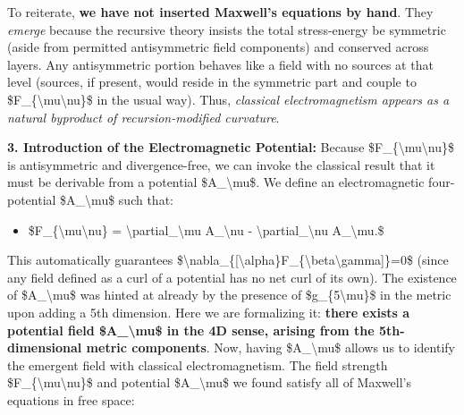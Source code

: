 \documentclass[
]{article}
\begin{document}
{To reiterate, \textbf{we have not inserted Maxwell's equations by hand}.
They \emph{emerge} because the recursive theory insists the total
stress-energy be symmetric (aside from permitted antisymmetric field
components) and conserved across layers. Any antisymmetric portion
behaves like a field with no sources at that level (sources, if present,
would reside in the symmetric part and couple to
\$F\_\{\textbackslash mu\textbackslash nu\}\$ in the usual way). Thus,
\emph{classical electromagnetism appears as a natural byproduct of
recursion-modified curvature}\hspace{0pt}.

\textbf{3. Introduction of the Electromagnetic Potential:} Because
\$F\_\{\textbackslash mu\textbackslash nu\}\$ is antisymmetric and
divergence-free, we can invoke the classical result that it must be
derivable from a potential \$A\_\textbackslash mu\$. We define an
electromagnetic four-potential \$A\_\textbackslash mu\$ such that:

\begin{itemize}
\item
  \$F\_\{\textbackslash mu\textbackslash nu\} =
  \textbackslash partial\_\textbackslash mu A\_\textbackslash nu -
  \textbackslash partial\_\textbackslash nu A\_\textbackslash mu.\$
\end{itemize}

This automatically guarantees
\$\textbackslash nabla\_\{{[}\textbackslash alpha\}F\_\{\textbackslash beta\textbackslash gamma{]}\}=0\$
(since any field defined as a curl of a potential has no net curl of its
own). The existence of \$A\_\textbackslash mu\$ was hinted at already by
the presence of \$g\_\{5\textbackslash mu\}\$ in the metric upon adding
a 5th dimension. Here we are formalizing it: \textbf{there exists a
potential field \$A\_\textbackslash mu\$ in the 4D sense, arising from
the 5th-dimensional metric components}\hspace{0pt}. Now, having
\$A\_\textbackslash mu\$ allows us to identify the emergent field with
classical electromagnetism. The field strength
\$F\_\{\textbackslash mu\textbackslash nu\}\$ and potential
\$A\_\textbackslash mu\$ we found satisfy all of Maxwell's equations in
free space:

}
\end{document}
